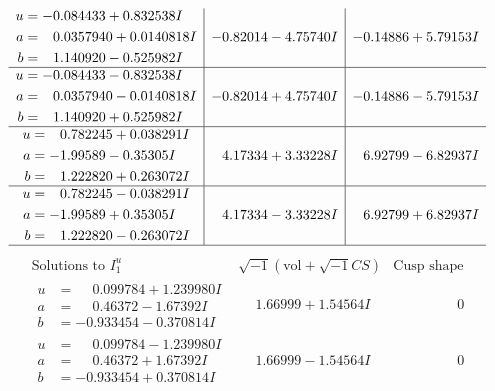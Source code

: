 \documentclass[1p]{elsarticle_modified}
\theoremstyle{definition}
\newcommand{\I}{\sqrt{-1}}
\begin{document}
$$\begin{array}{c|c|c}
\begin{aligned}
u &= -0.084433 + 0.832538 I \\
a &= \phantom{-}0.0357940 + 0.0140818 I \\
b &= \phantom{-}1.140920 - 0.525982 I\end{aligned}
 & -0.82014 - 4.75740 I & -0.14886 + 5.79153 I \\ \hline\begin{aligned}
u &= -0.084433 - 0.832538 I \\
a &= \phantom{-}0.0357940 - 0.0140818 I \\
b &= \phantom{-}1.140920 + 0.525982 I\end{aligned}
 & -0.82014 + 4.75740 I & -0.14886 - 5.79153 I \\ \hline\begin{aligned}
u &= \phantom{-}0.782245 + 0.038291 I \\
a &= -1.99589 - 0.35305 I \\
b &= \phantom{-}1.222820 + 0.263072 I\end{aligned}
 & \phantom{-}4.17334 + 3.33228 I & \phantom{-}6.92799 - 6.82937 I \\ \hline\begin{aligned}
u &= \phantom{-}0.782245 - 0.038291 I \\
a &= -1.99589 + 0.35305 I \\
b &= \phantom{-}1.222820 - 0.263072 I\end{aligned}
 & \phantom{-}4.17334 - 3.33228 I & \phantom{-}6.92799 + 6.82937 I\\
 \hline 
 \end{array}$$\newpage$$\begin{array}{c|c|c}  
\text{Solutions to }I^u_{1}& \I (\text{vol} + \sqrt{-1}CS) & \text{Cusp shape}\\
 \hline 
\begin{aligned}
u &= \phantom{-}0.099784 + 1.239980 I \\
a &= \phantom{-}0.46372 - 1.67392 I \\
b &= -0.933454 - 0.370814 I\end{aligned}
 & \phantom{-}1.66999 + 1.54564 I & \phantom{-0.000000 } 0 \\ \hline\begin{aligned}
u &= \phantom{-}0.099784 - 1.239980 I \\
a &= \phantom{-}0.46372 + 1.67392 I \\
b &= -0.933454 + 0.370814 I\end{aligned}
 & \phantom{-}1.66999 - 1.54564 I & \phantom{-0.000000 } 0 \\ \hline\begin{aligned}

\end{aligned}
\end{array}$$
\end{document}
